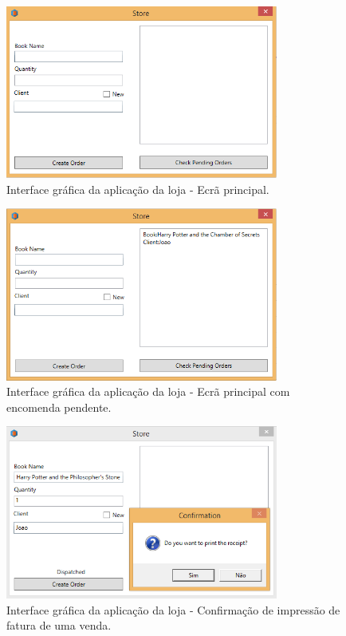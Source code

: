 \documentclass[12pt]{article}
\begin{document}
\begin{figure}[H]
    \centering
    \includegraphics[width=0.8\textwidth]{Store_GUI_Main.png}
    \caption{Interface gráfica da aplicação da loja - Ecrã principal.}
    \label{fig:c2}
\end{figure}
\begin{figure}[H]
    \centering
    \includegraphics[width=0.8\textwidth]{Store_GUI_Order_Pending.png}
    \caption{Interface gráfica da aplicação da loja - Ecrã principal com encomenda pendente.}
    \label{fig:c3}
\end{figure}
\begin{figure}[H]
    \centering
    \includegraphics[width=0.8\textwidth]{Store_GUI_Receipt_Confirmation_Dialog.png}
    \caption{Interface gráfica da aplicação da loja - Confirmação de impressão de fatura de uma venda.}
    \label{fig:c4}
\end{figure}
\end{document}
